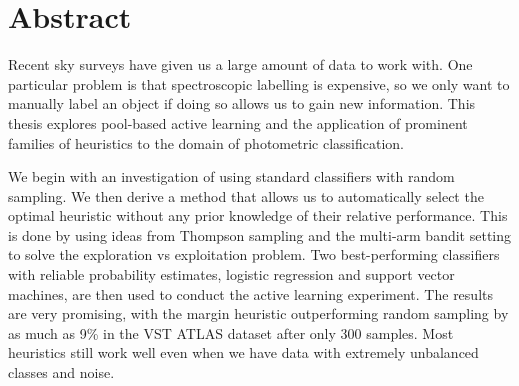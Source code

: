 
\chapter*{Abstract}
\label{cha:abstract}

Recent sky surveys have given us a large amount of data to work with. One particular
problem is that spectroscopic labelling is expensive, so we only want to manually label
an object if doing so allows us to gain new information. This thesis explores pool-based
active learning and the application of prominent families of heuristics to the
domain of photometric classification.

We begin with an investigation of using
standard classifiers with random sampling. We then derive a method that allows us to automatically select
the optimal heuristic without any prior knowledge of their relative performance. This is done by
using ideas from Thompson sampling and the multi-arm bandit setting to solve the exploration vs exploitation problem. Two best-performing classifiers with reliable probability estimates, logistic regression and support vector machines, are then used to conduct the active learning experiment. The results are very promising, with the margin heuristic outperforming random sampling by as much as 9\% in the VST ATLAS dataset after only 300 samples. Most heuristics still work well even when we have data with extremely unbalanced classes and noise.

